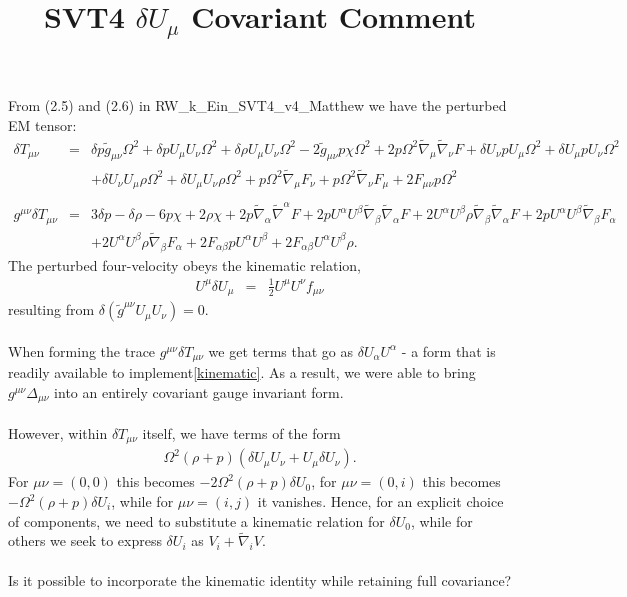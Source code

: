 \documentclass[10pt,letterpaper]{article}
\title{SVT4 $\delta U_\mu$ Covariant Comment}
\date{}
\numberwithin{equation}{section}
\begin{document}
 
\maketitle
\noindent 
From (2.5) and (2.6) in RW\_k\_Ein\_SVT4\_v4\_Matthew we have the perturbed EM tensor:
\begin{eqnarray}
\delta T_{\mu\nu}&=& \delta p \tilde{g}_{\mu \nu } \Omega^2 + \delta p U_{\mu } U_{\nu } \Omega^2 + \delta \rho U_{\mu } U_{\nu } \Omega^2 - 2 \tilde{g}_{\mu \nu } p \chi \Omega^2 + 2 p \Omega^2 \tilde{\nabla}_{\mu }\tilde{\nabla}_{\nu }F+\delta U_{\nu } p U_{\mu } \Omega^2 + \delta U_{\mu } p U_{\nu } \Omega^2 \nonumber \\ 
&& + \delta U_{\nu } U_{\mu } \rho \Omega^2 + \delta U_{\mu } U_{\nu } \rho \Omega^2 + p \Omega^2 \tilde{\nabla}_{\mu }F_{\nu } + p \Omega^2 \tilde{\nabla}_{\nu }F_{\mu }+2 F_{\mu \nu } p \Omega^2
\\  \nonumber\\ 
g^{\mu\nu}\delta T_{\mu\nu}&=& 3 \delta p -  \delta \rho - 6 p \chi + 2 \rho \chi + 2 p \tilde{\nabla}_{\alpha }\tilde{\nabla}^{\alpha }F + 2 p U^{\alpha } U^{\beta } \tilde{\nabla}_{\beta }\tilde{\nabla}_{\alpha }F + 2 U^{\alpha } U^{\beta } \rho \tilde{\nabla}_{\beta }\tilde{\nabla}_{\alpha }F+2 p U^{\alpha } U^{\beta } \tilde{\nabla}_{\beta }F_{\alpha } \nonumber \\ 
&& + 2 U^{\alpha } U^{\beta } \rho \tilde{\nabla}_{\beta }F_{\alpha }+2 F_{\alpha \beta } p U^{\alpha } U^{\beta } + 2 F_{\alpha \beta } U^{\alpha } U^{\beta } \rho .
\end{eqnarray}
The perturbed four-velocity obeys the kinematic relation,
\begin{eqnarray}
U^\mu \delta U_\mu &=& \tfrac12 U^\mu U^\nu f_{\mu\nu}
\label{kinematic}
\end{eqnarray}
resulting from $\delta (\tilde g^{\mu\nu} U_\mu U_\nu)=0$.
\\ \\
When forming the trace $g^{\mu\nu}\delta T_{\mu\nu}$ we get terms that go as $\delta U_\alpha U^\alpha$ - a form that is readily available to implement\eqref{kinematic}. As a result, we were able to bring $g^{\mu\nu}\Delta_{\mu\nu}$ into an entirely covariant gauge invariant form.
\\ \\
However, within $\delta T_{\mu\nu}$ itself, we have terms of the form
\begin{eqnarray}
\Omega^2 (\rho+p)(\delta U_\mu U_\nu + U_\mu \delta U_\nu).
\end{eqnarray}
For $\mu\nu=(0,0)$ this becomes $-2\Omega^2 (\rho+p)\delta U_0$, for $\mu\nu=(0,i)$ this becomes $-\Omega^2 (\rho+p)\delta U_i$, while for $\mu\nu=(i,j)$ it vanishes. Hence, for an explicit choice of components, we need to substitute a kinematic relation for $\delta U_0$, while for others we seek to express $\delta U_i$ as $V_i + \tilde\nabla_i V$. 
\\ \\
Is it possible to incorporate the kinematic identity while retaining full covariance? 
\end{document}
